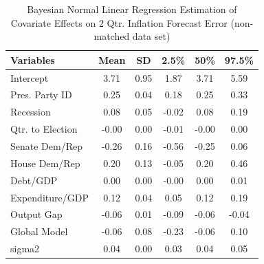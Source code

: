 \documentclass[a4paper]{article}\usepackage{graphicx, color}
\begin{document}

\begin{table}[ht]
\begin{center}
\caption{Bayesian Normal Linear Regression Estimation of Covariate Effects on 2 Qtr. Inflation Forecast Error (non-matched data set)}
\label{OutputNB}
{\small
\begin{tabular}{lccccc}
  \hline
Variables & Mean & SD & 2.5\% & 50\% & 97.5\% \\ 
  \hline
Intercept & 3.71 & 0.95 & 1.87 & 3.71 & 5.59 \\ 
  Pres. Party ID & 0.25 & 0.04 & 0.18 & 0.25 & 0.33 \\ 
  Recession & 0.08 & 0.05 & -0.02 & 0.08 & 0.19 \\ 
  Qtr. to Election & -0.00 & 0.00 & -0.01 & -0.00 & 0.00 \\ 
  Senate Dem/Rep & -0.26 & 0.16 & -0.56 & -0.25 & 0.06 \\ 
  House Dem/Rep & 0.20 & 0.13 & -0.05 & 0.20 & 0.46 \\ 
  Debt/GDP & 0.00 & 0.00 & -0.00 & 0.00 & 0.01 \\ 
  Expenditure/GDP & 0.12 & 0.04 & 0.05 & 0.12 & 0.19 \\ 
  Output Gap & -0.06 & 0.01 & -0.09 & -0.06 & -0.04 \\ 
  Global Model & -0.06 & 0.08 & -0.23 & -0.06 & 0.10 \\ 
  sigma2 & 0.04 & 0.00 & 0.03 & 0.04 & 0.05 \\ 
   \hline
\end{tabular}
}
\end{center}
\end{table}





\end{document}

